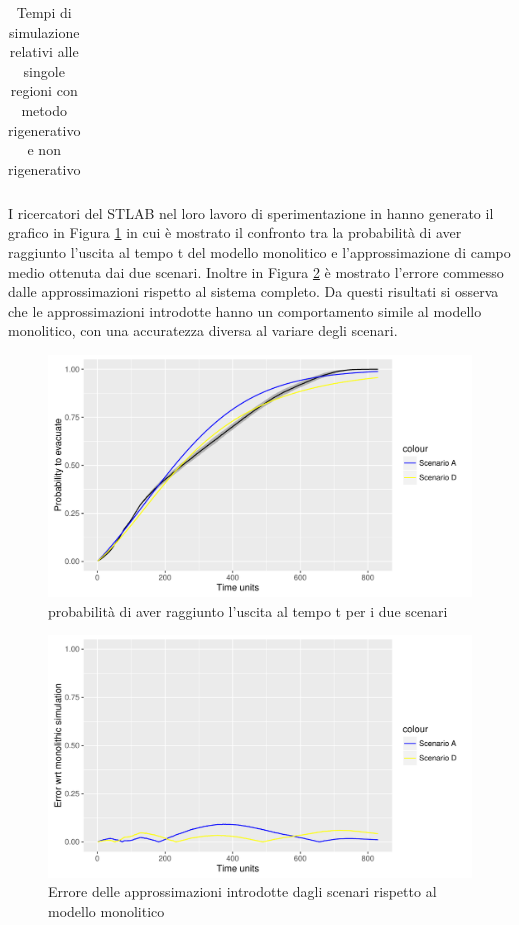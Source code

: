 \begin{table}[h]
{\begin{tabular}{ |l|l|l| }
	
	\end{tabular}
  }
  \caption{Tempi di simulazione relativi alle singole regioni con metodo rigenerativo e non rigenerativo}
  \label{tab:tabelle-dati-simulazioni}
\end{table}

I ricercatori del STLAB nel loro lavoro di sperimentazione in \cite{esperimenti-sandro} hanno generato il grafico in Figura \ref{fig:scenariosAD} in cui è mostrato il confronto tra la probabilità di aver raggiunto l'uscita al tempo t del modello monolitico e l'approssimazione di campo medio ottenuta dai due scenari. Inoltre in Figura \ref{fig:errorsplotAD} è mostrato l'errore commesso dalle approssimazioni rispetto al sistema completo. Da questi risultati si osserva che le approssimazioni introdotte hanno un comportamento simile al modello monolitico, con una accuratezza diversa al variare degli scenari.

\begin{figure}[htbp]
\centering
\includegraphics[width=\textwidth,height=\textheight,keepaspectratio]{images/scenariosAD.pdf}
\caption{probabilità di aver raggiunto l'uscita al tempo t per i due scenari}
\label{fig:scenariosAD}
\end{figure}

\begin{figure}[htbp]
\centering
\includegraphics[width=\textwidth,height=\textheight,keepaspectratio]{images/errorplotAD.pdf}
\caption{Errore delle approssimazioni introdotte dagli scenari rispetto al modello monolitico}
\label{fig:errorsplotAD}
\end{figure}

 